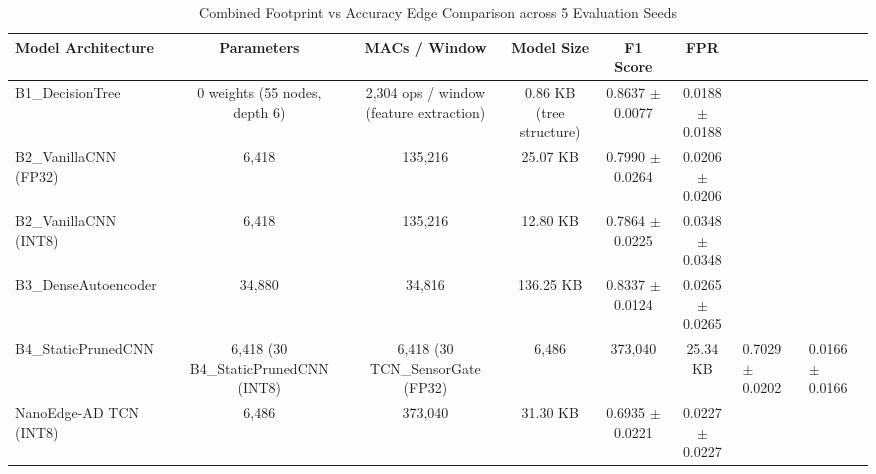 \begin{table}[t]
\centering
\caption{Combined Footprint vs Accuracy Edge Comparison across 5 Evaluation Seeds}
\label{tab:footprint_accuracy}
\small
\begin{tabular}{lccccc}
\toprule
\textbf{Model Architecture} & \textbf{Parameters} & \textbf{MACs / Window} & \textbf{Model Size} & \textbf{F1 Score} & \textbf{FPR} \\
\midrule
B1\_DecisionTree & 0 weights (55 nodes, depth 6) & 2,304 ops / window (feature extraction) & 0.86 KB (tree structure) & 0.8637 $\pm$ 0.0077 & 0.0188 $\pm$ 0.0188 \\
B2\_VanillaCNN (FP32) & 6,418 & 135,216 & 25.07 KB & 0.7990 $\pm$ 0.0264 & 0.0206 $\pm$ 0.0206 \\
B2\_VanillaCNN (INT8) & 6,418 & 135,216 & 12.80 KB & 0.7864 $\pm$ 0.0225 & 0.0348 $\pm$ 0.0348 \\
B3\_DenseAutoencoder & 34,880 & 34,816 & 136.25 KB & 0.8337 $\pm$ 0.0124 & 0.0265 $\pm$ 0.0265 \\
B4\_StaticPrunedCNN & 6,418 (30%
B4\_StaticPrunedCNN (INT8) & 6,418 (30%
TCN\_SensorGate (FP32) & 6,486 & 373,040 & 25.34 KB & 0.7029 $\pm$ 0.0202 & 0.0166 $\pm$ 0.0166 \\
NanoEdge-AD TCN (INT8) & 6,486 & 373,040 & 31.30 KB & 0.6935 $\pm$ 0.0221 & 0.0227 $\pm$ 0.0227 \\
\bottomrule
\end{tabular}
\end{table}